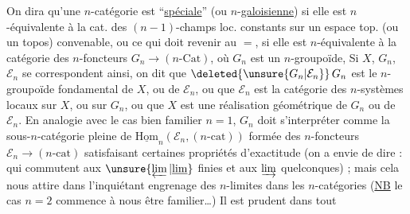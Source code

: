 On dira qu'une $n$-catégorie  est ``\uline{spéciale}'' (ou $n$-\uline{galoisienne}) si elle est $n$-équivalente à la cat. des $(n-1)$-champs loc. constants sur un espace top. (ou un topos) convenable, ou ce qui doit revenir au $=$, si elle est $n$-équivalente à la catégorie des $n$-foncteurs $G_n\longrightarrow(n\text{-}\mathrm{Cat})$, où $G_n$ est un $n$-groupoïde, Si $X$, $G_n$, $\mathcal E_n$ se correspondent ainsi, on dit que $\deleted{\unsure{G_n|\mathcal E_n}}\,G_n$ est le $n$-groupoïde fondamental de $X$, ou de $\mathcal E_n$, ou que $\mathcal E_n$ est la catégorie des $n$-systèmes locaux sur $X$, ou sur $G_n$, ou que $X$ est une réalisation géométrique de $G_n$ ou de $\mathcal E_n$. En analogie avec le cas bien familier $n=1$, $G_n$ doit s'interpréter comme la sous-$n$-catégorie pleine de $\underline{\mathrm{Hom}}_n(\mathcal E_n,(n\text{-}\mathrm{cat}))$ formée des $n$-foncteurs $\mathcal E_n\to(n\text{-}\mathrm{cat})$ satisfaisant certaines propriétés d'exactitude (on a envie de dire : qui commutent aux $\unsure{\varprojlim|\underline{\lim}}$ finies et aux $\varinjlim$ quelconques) ; mais cela nous attire dans l'inquiétant engrenage des $n$-limites dans les $n$-catégories (\uline{NB} le cas $n=2$ commence à nous être familier\ldots) Il est prudent dans tout
